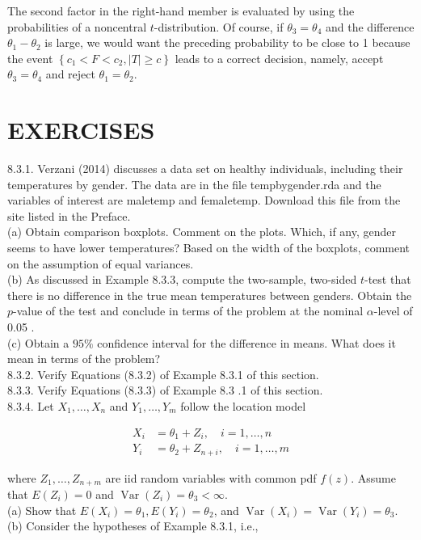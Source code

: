 The second factor in the right-hand member is evaluated by using the probabilities of a noncentral $t$-distribution. Of course, if $\theta_{3}=\theta_{4}$ and the difference $\theta_{1}-\theta_{2}$ is large, we would want the preceding probability to be close to 1 because the event $\left\{c_{1}<F<c_{2},|T| \geq c\right\}$ leads to a correct decision, namely, accept $\theta_{3}=\theta_{4}$ and reject $\theta_{1}=\theta_{2}$.

\section*{EXERCISES}
8.3.1. Verzani (2014) discusses a data set on healthy individuals, including their temperatures by gender. The data are in the file tempbygender.rda and the variables of interest are maletemp and femaletemp. Download this file from the site listed in the Preface.\\
(a) Obtain comparison boxplots. Comment on the plots. Which, if any, gender seems to have lower temperatures? Based on the width of the boxplots, comment on the assumption of equal variances.\\
(b) As discussed in Example 8.3.3, compute the two-sample, two-sided $t$-test that there is no difference in the true mean temperatures between genders. Obtain the $p$-value of the test and conclude in terms of the problem at the nominal $\alpha$-level of 0.05 .\\
(c) Obtain a $95 \%$ confidence interval for the difference in means. What does it mean in terms of the problem?\\
8.3.2. Verify Equations (8.3.2) of Example 8.3.1 of this section.\\
8.3.3. Verify Equations (8.3.3) of Example 8.3 .1 of this section.\\
8.3.4. Let $X_{1}, \ldots, X_{n}$ and $Y_{1}, \ldots, Y_{m}$ follow the location model

$$
\begin{aligned}
X_{i} & =\theta_{1}+Z_{i}, \quad i=1, \ldots, n \\
Y_{i} & =\theta_{2}+Z_{n+i}, \quad i=1, \ldots, m
\end{aligned}
$$

where $Z_{1}, \ldots, Z_{n+m}$ are iid random variables with common pdf $f(z)$. Assume that $E\left(Z_{i}\right)=0$ and $\operatorname{Var}\left(Z_{i}\right)=\theta_{3}<\infty$.\\
(a) Show that $E\left(X_{i}\right)=\theta_{1}, E\left(Y_{i}\right)=\theta_{2}$, and $\operatorname{Var}\left(X_{i}\right)=\operatorname{Var}\left(Y_{i}\right)=\theta_{3}$.\\
(b) Consider the hypotheses of Example 8.3.1, i.e.,

